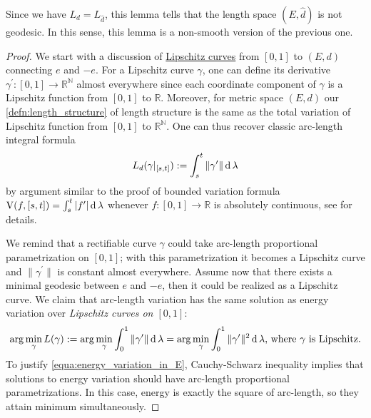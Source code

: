 Since we have $ L_d = L_{\hat{d}}$,
this lemma tells that the length space $(E, \hat{d})$ is not geodesic.
In this sense, this lemma is a non-smooth version of the previous one.

\begin{proof}
	We start with a discussion of \underline{Lipschitz curves} from $[0,1]$ to $(E,d)$ connecting $e$ and $-e$.
	For a Lipschitz curve $\gamma$,
	one can define its derivative $\gamma^\prime: [0,1] \rightarrow \mathbb{R}^\mathbb{N}$ almost everywhere
	since each coordinate component of $\gamma$ is a Lipschitz function from $[0,1]$ to $\mathbb{R}$.
	Moreover, for metric space $(E,d)$ our \cref{defn:length_structure} of length structure is the same as
	the total variation of Lipschitz function from $[0,1]$ to $\mathbb{R}^\mathbb{N}$.
	One can thus recover classic arc-length integral formula
	\[
		L_d(\gamma |_{[s,t]}):= \int_s^t \| \gamma^\prime \| \operatorname{d} \lambda
	\]
	by argument similar to the proof of bounded variation formula
	$\operatorname{V}(f, [s , t] )= \int_s^t |f^\prime| \operatorname{d} \lambda$ whenever $f: [0,1] \rightarrow \mathbb{R}$ is absolutely continuous,
	see \cite[Section 5.3]{Bogachev2007} for details.

	We remind that a rectifiable curve $\gamma$ could take arc-length proportional parametrization on $[0,1]$;
	with this parametrization
	it becomes a Lipschitz curve and $\| \gamma^\prime \|$ is constant almost everywhere.
	Assume now that there exists a minimal geodesic between $e$ and $-e$,
	then it could be realized as a Lipschitz curve.
	We claim that arc-length variation has the same solution as energy variation
	over \emph{Lipschitz curves on $[0,1]$}:
	\begin{equation}
		\label{equa:energy_variation_in_E}
		\arg \min_{\gamma} L (\gamma) :=
		\arg \min_{\gamma} \int_{0}^{1} \| \gamma^\prime \| \operatorname{d} \lambda =
		\arg \min_{\gamma} \int_{0}^{1} \| \gamma^\prime \| ^2 \operatorname{d} \lambda
		\text{, where } \gamma \text{ is Lipschitz}.
	\end{equation}
	To justify \cref{equa:energy_variation_in_E},
	Cauchy-Schwarz inequality implies that
	solutions to energy variation should have arc-length proportional parametrizations.
	In this case, energy is exactly the square of arc-length, so they attain minimum simultaneously.


\end{proof}

